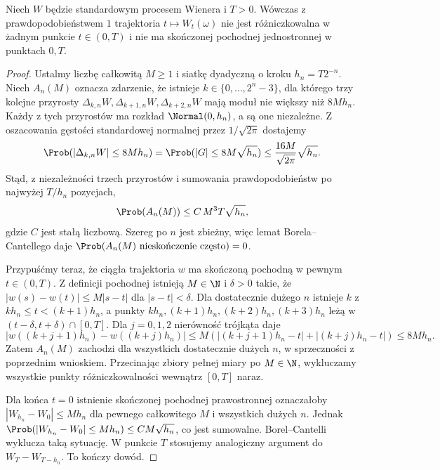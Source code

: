 \begin{twierdzenie}
Niech $W$ będzie standardowym procesem Wienera i $T>0$.
Wówczas z prawdopodobieństwem $1$ trajektoria
$t\mapsto W_t(\omega)$ nie jest różniczkowalna
w żadnym punkcie $t\in(0,T)$ i nie ma skończonej
pochodnej jednostronnej w punktach $0,T$.
\end{twierdzenie}
\begin{proof}
Ustalmy liczbę całkowitą $M\ge1$ i siatkę dyadyczną
o kroku $h_n=T2^{-n}$. Niech $A_n(M)$ oznacza zdarzenie,
że istnieje $k\in\{0,\ldots,2^n-3\}$, dla którego
trzy kolejne przyrosty
$\Delta_{k,n}W,\Delta_{k+1,n}W,\Delta_{k+2,n}W$
mają moduł nie większy niż $8Mh_n$.
Każdy z tych przyrostów ma rozkład $\Normal(0,h_n)$,
a są one niezależne. Z oszacowania gęstości standardowej
normalnej przez $1/\sqrt{2\pi}$ dostajemy
\[
\Prob(|\Delta_{k,n}W|\le8Mh_n)
=\Prob(|G|\le8M\sqrt{h_n})
\le \frac{16M}{\sqrt{2\pi}}\sqrt{h_n}.
\]
Stąd, z niezależności trzech przyrostów i sumowania
prawdopodobieństw po najwyżej $T/h_n$ pozycjach,
\[
\Prob(A_n(M))\le C\,M^3T\sqrt{h_n},
\]
gdzie $C$ jest stałą liczbową. Szereg po $n$ jest zbieżny,
więc lemat Borela--Cantellego daje
$\Prob(A_n(M)\text{ nieskończenie często})=0$.

Przypuśćmy teraz, że ciągła trajektoria $w$ ma skończoną
pochodną w pewnym $t\in(0,T)$. Z definicji pochodnej
istnieją $M\in\N$ i $\delta>0$ takie, że
$|w(s)-w(t)|\le M|s-t|$ dla $|s-t|<\delta$.
Dla dostatecznie dużego $n$ istnieje $k$ z
$kh_n\le t<(k+1)h_n$, a punkty
$kh_n,(k+1)h_n,(k+2)h_n,(k+3)h_n$
leżą w $(t-\delta,t+\delta)\cap[0,T]$.
Dla $j=0,1,2$ nierówność trójkąta daje
\[
|w((k+j+1)h_n)-w((k+j)h_n)|
\le M(|(k+j+1)h_n-t|+|(k+j)h_n-t|)
\le 8Mh_n.
\]
Zatem $A_n(M)$ zachodzi dla wszystkich dostatecznie
dużych $n$, w sprzeczności z poprzednim wnioskiem.
Przecinając zbiory pełnej miary po $M\in\N$,
wykluczamy wszystkie punkty różniczkowalności wewnątrz
$[0,T]$ naraz.

Dla końca $t=0$ istnienie skończonej pochodnej
prawostronnej oznaczałoby $|W_{h_n}-W_0|\le Mh_n$
dla pewnego całkowitego $M$ i wszystkich dużych $n$.
Jednak $\Prob(|W_{h_n}-W_0|\le Mh_n)\le C M\sqrt{h_n}$,
co jest sumowalne. Borel--Cantelli wyklucza taką
sytuację. W punkcie $T$ stosujemy analogiczny argument
do $W_T-W_{T-h_n}$. To kończy dowód.
\end{proof}

